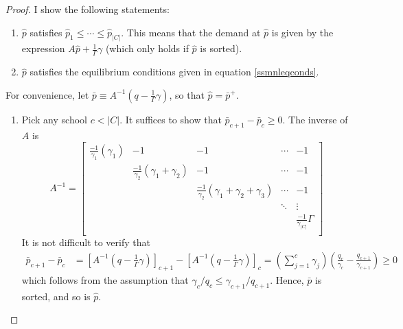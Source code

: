 \documentclass[12pt]{article}
\numberwithin{equation}{subsection}
\theoremstyle{definition}
\begin{document}
\begin{proof}
I show the following statements:
\begin{enumerate}
\item $\hat p$ satisfies $\hat p_1 \leq \cdots \leq \hat p_{|C|}$. This means that the demand at $\hat p$ is given by the expression $A \hat p + \frac{1}{\Gamma}\gamma$ (which only holds if $\hat p$ is sorted).
\item $\hat p$ satisfies the equilibrium conditions given in equation \eqref{ssmnleqconds}.
\end{enumerate}
For convenience, let $\bar p \equiv A^{-1} (q - \frac{1}{\Gamma} \gamma) $, so that $\hat p = \bar p^+$. 
\begin{enumerate}
\item Pick any school $c < |C|$. It suffices to show that $\bar p_{c+1} - \bar p_{c} \geq 0$. The inverse of $A$ is
\begin{equation} \label{Ainv}
A^{-1} = \begin{bmatrix}
\frac{-1}{\gamma_1}\left( \gamma_1 \right) & -1 & -1 &\cdots & -1 \\
 & \frac{-1}{\gamma_2}\left( \gamma_1 + \gamma_2 \right) & -1 &\cdots & -1 \\
 & & \frac{-1}{\gamma_2}\left( \gamma_1 + \gamma_2 + \gamma_3 \right) &\cdots & -1 \\
 &  &  & \ddots & \vdots \\
 & & & &  \frac{-1}{\gamma_{|C|}} \Gamma \\
\end{bmatrix}
\end{equation}
It is not difficult to verify that
\begin{align} \label{barpissorted}
\bar p_{c+1} - \bar p_{c}
&= \left[A^{-1} (q - \frac{1}{\Gamma} \gamma) \right]_{c+1} - \left[A^{-1} (q - \frac{1}{\Gamma} \gamma) \right]_{c} = \left(\sum_{j=1}^c \gamma_j \right) \left(\frac{q_c}{\gamma_c} - \frac{q_{c+1}}{\gamma_{c+1}}\right) \geq 0
\end{align}
which follows from the assumption that $\gamma_c / q_c \leq \gamma_{c+1} / q_{c+1}$. Hence, $\bar p$ is sorted, and so is $\hat p$. 



\end{enumerate}
\end{proof}
\end{document}
